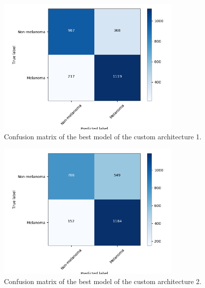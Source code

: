 \begin{figure}[ht]
    \centering
    \includegraphics[width=0.8\textwidth]{figs/custom1_best_confusionmatrix.png}
    \caption{Confusion matrix of the best model of the custom architecture 1.}
    \label{fig:custom1_best_confusionmatrix}
\end{figure}

\begin{figure}[ht]
    \centering
    \includegraphics[width=0.8\textwidth]{figs/custom2_best_confusionmatrix.png}
    \caption{Confusion matrix of the best model of the custom architecture 2.}
    \label{fig:custom2_best_confusionmatrix}
\end{figure}
